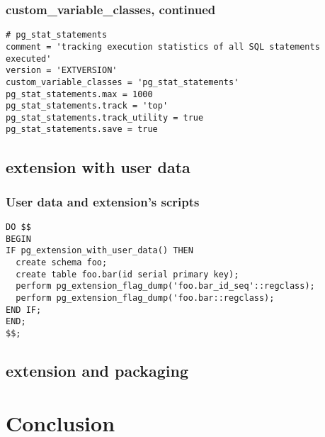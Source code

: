 \documentclass[english]{beamer}
\begin{document}
\begin{frame}[fragile]
  \frametitle{custom\_variable\_classes, continued}

  \begin{example}
\begin{verbatim}
# pg_stat_statements
comment = 'tracking execution statistics of all SQL statements executed'
version = 'EXTVERSION'
custom_variable_classes = 'pg_stat_statements'
pg_stat_statements.max = 1000
pg_stat_statements.track = 'top'
pg_stat_statements.track_utility = true
pg_stat_statements.save = true
\end{verbatim}
  \end{example}
\end{frame}

\subsection{extension with user data}


\begin{frame}[fragile]
  \frametitle{User data and extension's scripts}

  \begin{example}
\begin{verbatim}
DO $$
BEGIN
IF pg_extension_with_user_data() THEN
  create schema foo;
  create table foo.bar(id serial primary key);
  perform pg_extension_flag_dump('foo.bar_id_seq'::regclass);
  perform pg_extension_flag_dump('foo.bar::regclass);
END IF;
END;
$$;
\end{verbatim}
  \end{example}
\end{frame}

\subsection{extension and packaging}


\section{Conclusion}
\end{document}
